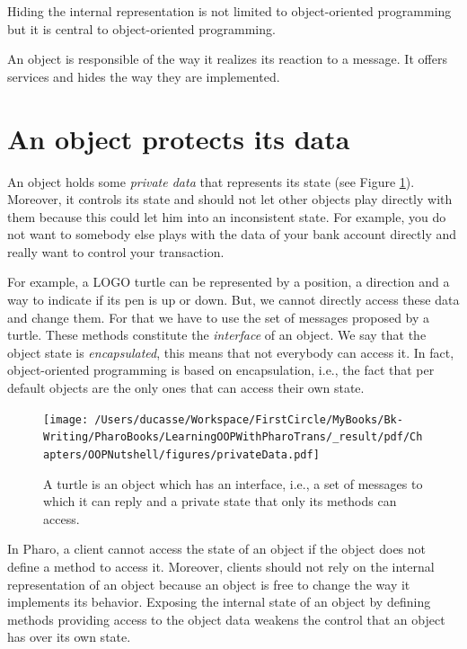 \documentclass[10pt,twoside,english]{_support/latex/sbabook/sbabook}
\begin{document}
Hiding the internal representation is not limited to object-oriented programming but it is central to object-oriented programming. 

\begin{important}
An object is responsible of the way it realizes its reaction to a message. It offers services and hides the way they are implemented.
\end{important}
\section{An object protects its data}
An object holds some \textit{private data} that represents its state (see Figure \ref{fig:objectOne}). Moreover, it controls its state and should not let other objects play directly with them because this could let him into an inconsistent state.  For example, you do not want to somebody else plays with the data of your bank account directly and really want to control your transaction.

For example, a LOGO turtle can be represented by a position, a direction and a way to indicate if its pen is up or down. But, we cannot directly access these data and change them. For that we have to use the set of messages proposed by a turtle. These methods constitute the \textit{interface} of an object. We say that the object state is \textit{encapsulated}, this means that not everybody can access it. In fact, object-oriented programming is based on encapsulation, i.e., the fact that per default objects are the only ones that can access their own state.


\begin{figure}

\begin{center}
\texttt{[image: /Users/ducasse/Workspace/FirstCircle/MyBooks/Bk-Writing/PharoBooks/LearningOOPWithPharoTrans/\_result/pdf/Chapters/OOPNutshell/figures/privateData.pdf]}\caption{A turtle is an object which has an interface, i.e., a set of messages to which it can reply and a private state that only its methods can access.\label{fig:objectOne}}\end{center}
\end{figure}


In Pharo, a client cannot access the state of an object if the object does not define a method to access it.  Moreover, clients should not  rely on the internal representation of an object because an object is free to change the way it  implements its behavior. Exposing the internal state of an object by defining methods providing access to the object data weakens the control that an object has over its own state.
\end{document}
